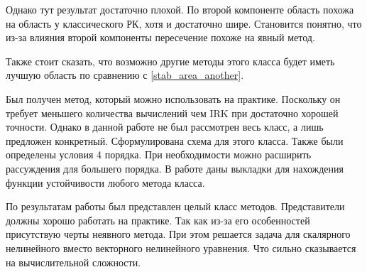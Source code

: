 \documentclass[a4paper,article,14pt]{extarticle}
\begin{document}
Однако тут результат достаточно плохой. По второй компоненте область похожа на область у классического РК, хотя и достаточно шире. Становится понятно, что из-за влияния второй компоненты пересечение похоже на явный метод.

Также стоит сказать, что возможно другие методы этого класса будет иметь лучшую область по сравнению с \ref{stab_area_another}.
\pagebreak


Был получен метод, который можно использовать на практике. Поскольку он требует меньшего количества вычислений чем IRK при достаточно хорошей точности. Однако в данной работе не был рассмотрен весь класс, а лишь предложен конкретный. Сформулирована схема для этого класса. Также были определены условия 4 порядка. При необходимости можно расширить рассуждения для большего порядка. В работе даны выкладки для нахождения функции устойчивости любого метода класса.
\pagebreak

По результатам работы был представлен целый класс методов. Представители должны хорошо работать на практике. Так как из-за его особенностей присутствую черты неявного метода. При этом решается задача для скалярного нелинейного вместо векторного нелинейного уравнения. Что сильно сказывается на вычислительной сложности.
\pagebreak
\end{document}
